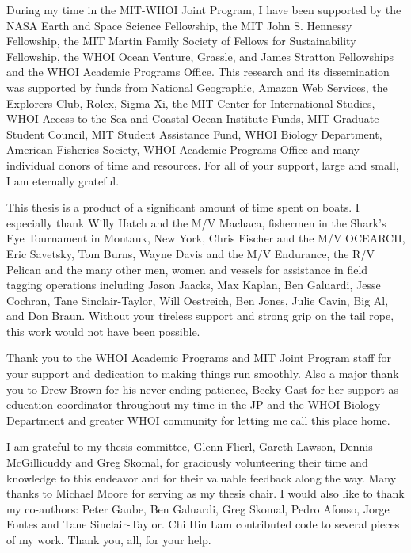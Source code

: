 {\parindent15pt

\singlespace
During my time in the MIT-WHOI Joint Program, I have been supported by the NASA Earth and Space Science Fellowship, the MIT John S. Hennessy Fellowship, the MIT Martin Family Society of Fellows for Sustainability Fellowship, the WHOI Ocean Venture, Grassle, and James Stratton Fellowships and the WHOI Academic Programs Office. This research and its dissemination was supported by funds from National Geographic, Amazon Web Services, the Explorers Club, Rolex, Sigma Xi, the MIT Center for International Studies, WHOI Access to the Sea and Coastal Ocean Institute Funds, MIT Graduate Student Council, MIT Student Assistance Fund, WHOI Biology Department, American Fisheries Society, WHOI Academic Programs Office and many individual donors of time and resources. For all of your support, large and small, I am eternally grateful. \par\bigskip

This thesis is a product of a significant amount of time spent on boats. I especially thank Willy Hatch and the M/V Machaca, fishermen in the Shark's Eye Tournament in Montauk, New York, Chris Fischer and the M/V OCEARCH, Eric Savetsky, Tom Burns, Wayne Davis and the M/V Endurance, the R/V Pelican and the many other men, women and vessels for assistance in field tagging operations including Jason Jaacks, Max Kaplan, Ben Galuardi, Jesse Cochran, Tane Sinclair-Taylor, Will Oestreich, Ben Jones, Julie Cavin, Big Al, and Don Braun. Without your tireless support and strong grip on the tail rope, this work would not have been possible.

Thank you to the WHOI Academic Programs and MIT Joint Program staff for your support and dedication to making things run smoothly. Also a major thank you to Drew Brown for his never-ending patience, Becky Gast for her support as education coordinator throughout my time in the JP and the WHOI Biology Department and greater WHOI community for letting me call this place home.

I am grateful to my thesis committee, Glenn Flierl, Gareth Lawson, Dennis McGillicuddy and Greg Skomal, for graciously volunteering their time and knowledge to this endeavor and for their valuable feedback along the way. Many thanks to Michael Moore for serving as my thesis chair. I would also like to thank my co-authors: Peter Gaube, Ben Galuardi, Greg Skomal, Pedro Afonso, Jorge Fontes and Tane Sinclair-Taylor. Chi Hin Lam contributed code to several pieces of my work. Thank you, all, for your help.

}
